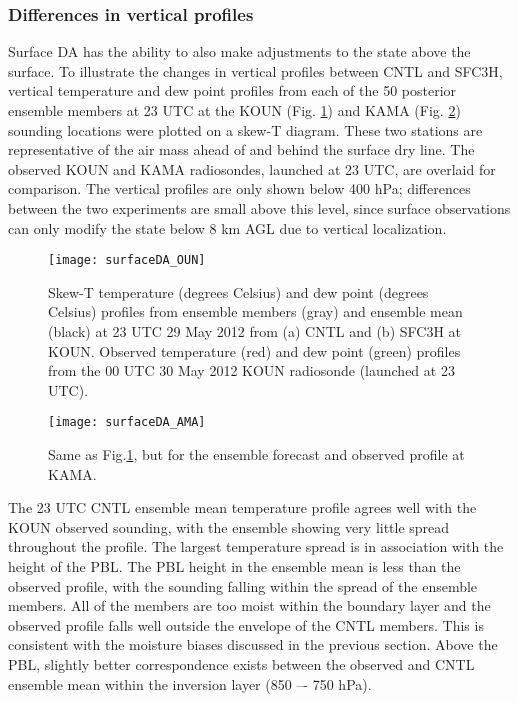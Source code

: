 \subsubsection{Differences in vertical profiles}
Surface DA has the ability to also make adjustments to the state above the surface. To illustrate the changes in vertical profiles between CNTL and SFC3H, vertical temperature and dew point profiles from each of the 50 posterior ensemble members at 23 UTC at the KOUN (Fig. \ref{sfcda_oun}) and KAMA (Fig. \ref{sfcda_ama}) sounding locations were plotted on a skew-T diagram. These two stations are representative of the air mass ahead of and behind the surface dry line. The observed KOUN and KAMA radiosondes, launched at 23 UTC, are overlaid for comparison. The vertical profiles are only shown below 400 hPa; differences between the two experiments are small above this level, since surface observations can only modify the state below 8 km AGL due to vertical localization.
\begin{figure}
\centering
\texttt{[image: surfaceDA\_OUN]}
\caption{Skew-T temperature (degrees Celsius) and dew point (degrees Celsius) profiles from ensemble members (gray) and ensemble mean (black) at 23 UTC 29 May 2012 from (a) CNTL and (b) SFC3H at KOUN. Observed temperature (red) and dew point (green) profiles from the 00 UTC 30 May 2012 KOUN radiosonde (launched at 23 UTC).}
\label{sfcda_oun}
\end{figure}
\begin{figure}
\centering
\texttt{[image: surfaceDA\_AMA]}
\caption{Same as Fig.\ref{sfcda_oun}, but for the ensemble forecast and observed profile at KAMA.}
\label{sfcda_ama}
\end{figure}

The 23 UTC CNTL ensemble mean temperature profile agrees well with the KOUN observed sounding, with the ensemble showing very little spread throughout the profile. The largest temperature spread is in association with the height of the PBL. The PBL height in the ensemble mean is less than the observed profile, with the sounding falling within the spread of the ensemble members. All of the members are too moist within the boundary layer and the observed profile falls well outside the envelope of the CNTL members. This is consistent with the moisture biases discussed in the previous section. Above the PBL, slightly better correspondence exists between the observed and CNTL ensemble mean within the inversion layer (850 –- 750 hPa).

